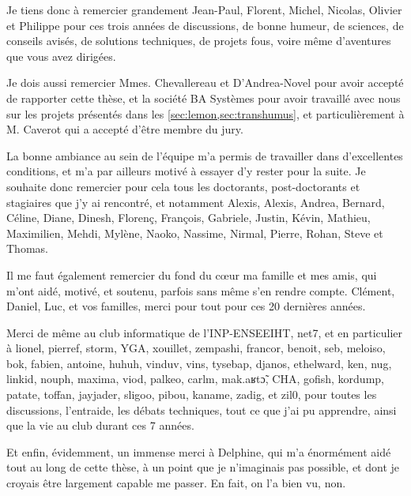 Je tiens donc à remercier grandement Jean-Paul, Florent, Michel, Nicolas, Olivier et Philippe pour ces trois années
de discussions, de bonne humeur, de sciences, de conseils avisés, de solutions techniques, de projets fous, voire même
d'aventures que vous avez dirigées.

Je dois aussi remercier Mmes. Chevallereau et D'Andrea-Novel pour avoir accepté de rapporter cette thèse, et la société
BA Systèmes pour avoir travaillé avec nous sur les projets présentés dans les \cref{sec:lemon,sec:transhumus}, et
particulièrement à M. Caverot qui a accepté d'être membre du jury.

La bonne ambiance au sein de l'équipe m'a permis de travailler dans d'excellentes conditions, et m'a par ailleurs
motivé à essayer d'y rester pour la suite. Je souhaite donc remercier pour cela tous les doctorants, post-doctorants
et stagiaires que j'y ai rencontré, et notamment Alexis, Alexis, Andrea, Bernard, Céline, Diane, Dinesh, Florenç,
François, Gabriele, Justin, Kévin, Mathieu, Maximilien, Mehdi, Mylène, Naoko, Nassime, Nirmal, Pierre, Rohan, Steve et
Thomas.

Il me faut également remercier du fond du cœur ma famille et mes amis, qui m'ont aidé, motivé, et soutenu, parfois sans
même s'en rendre compte. Clément, Daniel, Luc, et vos familles, merci pour tout pour ces 20 dernières années.

Merci de même au club informatique de l'INP-ENSEEIHT, net7, et en particulier à lionel, pierref, storm, YGA, xouillet,
zempashi, francor, benoit, seb, meloiso, bok, fabien, antoine, huhuh, vinduv, vins, tysebap, djanos, ethelward, ken,
nug, linkid, nouph, maxima, viod, palkeo, carlm, mak.aʁtɔ̃, CHA, gofish, kordump, patate, toffan, jayjader, sligoo,
pibou, kaname, zadig, et zil0, pour toutes les discussions, l'entraide, les débats techniques, tout ce que j'ai pu
apprendre, ainsi que la vie au club durant ces 7 années.

Et enfin, évidemment, un immense merci à Delphine, qui m'a énormément aidé tout au long de cette thèse, à un point que
je n'imaginais pas possible, et dont je croyais être largement capable me passer. En fait, on l'a bien vu, non.
